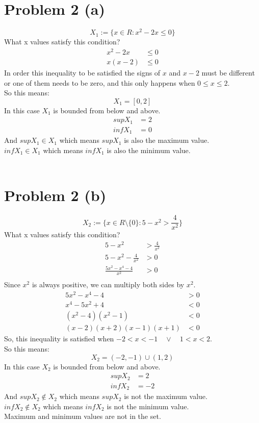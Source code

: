 \documentclass{article}
\begin{document}
\section*{Problem 2 (a)}
\[
   X_1 := \{x \in R: x^2 - 2x \leq 0\}
\]
What x values satisfy this condition? \\
\begin{align*}
   x^2 - 2x &\leq 0 \\
   x(x - 2) &\leq 0
\end{align*}
In order this inequality to be satisfied the signs of \(x\) and \(x - 2\) must be different or one of them needs to be zero, 
and this only happens when \(0 \leq x \leq 2\). \\
So this means:
\[
   X_1 = [0, 2]
\]
In this case \(X_1\) is bounded from below and above.\\
\begin{align*}
   sup X_1 &= 2 \\
   inf X_1 &= 0
\end{align*}
And \(sup X_1 \in X_1\) which means \(sup X_1\) is also the maximum value.\\
\(inf X_1 \in X_1\) which means \(inf X_1\) is also the minimum value.\\
\\
\section*{Problem 2 (b)}
\[
   X_2 := \{x \in R \setminus \{0\}: 5 - x^2 > \frac{4}{x^2}\}
\]
What x values satisfy this condition? \\
\begin{align*}
   5 - x^2 &> \frac{4}{x^2} \\
   5 - x^2 - \frac{4}{x^2} &> 0 \\
   \frac{5x^2 - x^4 - 4}{x^2} &> 0 \\
\end{align*}
Since \(x^2\) is always positive, we can multiply both sides by \(x^2\).\\
\begin{align*}
   5x^2 - x^4 - 4 &> 0 \\
   x^4 - 5x^2 + 4 &< 0 \\
   (x^2 - 4)(x^2 - 1) &< 0 \\
   (x - 2)(x + 2)(x - 1)(x + 1) &< 0
\end{align*}
So, this inequality is satisfied when \(-2 < x < -1 \quad \lor \quad 1 < x < 2\).\\
So this means:
\[
   X_2 = (-2, -1) \cup (1, 2)
\]
In this case \(X_2\) is bounded from below and above.\\
\begin{align*}
   sup X_2 &= 2 \\
   inf X_2 &= -2
\end{align*}
And \(sup X_2 \notin X_2\) which means \(sup X_2\) is not the maximum value.\\
\(inf X_2 \notin X_2\) which means \(inf X_2\) is not the minimum value.\\
Maximum and minimum values are not in the set.\\
\end{document}
